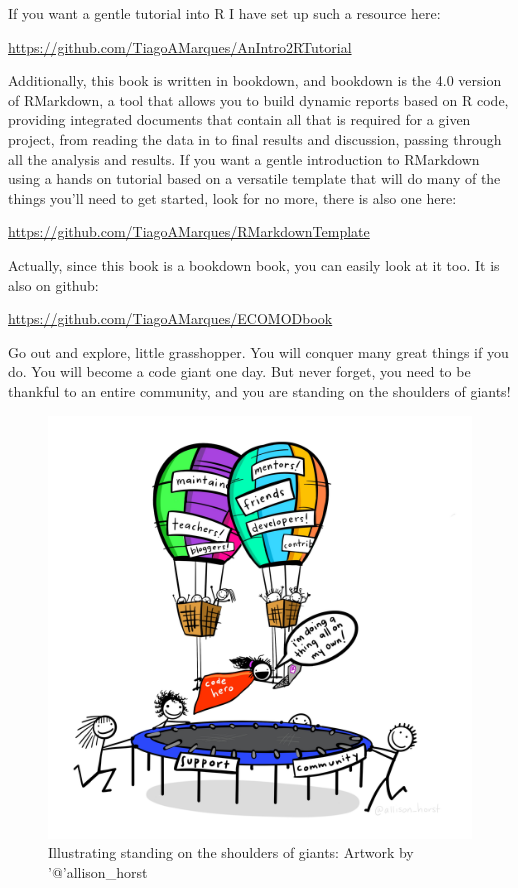 \documentclass[
]{book}
\begin{document}
If you want a gentle tutorial into R I have set up such a resource here:

\url{https://github.com/TiagoAMarques/AnIntro2RTutorial}

Additionally, this book is written in bookdown, and bookdown is the 4.0 version of RMarkdown, a tool that allows you to build dynamic reports based on R code, providing integrated documents that contain all that is required for a given project, from reading the data in to final results and discussion, passing through all the analysis and results. If you want a gentle introduction to RMarkdown using a hands on tutorial based on a versatile template that will do many of the things you'll need to get started, look for no more, there is also one here:

\url{https://github.com/TiagoAMarques/RMarkdownTemplate}

Actually, since this book is a bookdown book, you can easily look at it too. It is also on github:

\url{https://github.com/TiagoAMarques/ECOMODbook}

Go out and explore, little grasshopper. You will conquer many great things if you do. You will become a code giant one day. But never forget, you need to be thankful to an entire community, and you are standing on the shoulders of giants!

\begin{figure}
\centering
\includegraphics{extfiles/code_hero.jpg}
\caption{Illustrating standing on the shoulders of giants: Artwork by '@'allison\_horst}
\end{figure}
\end{document}
